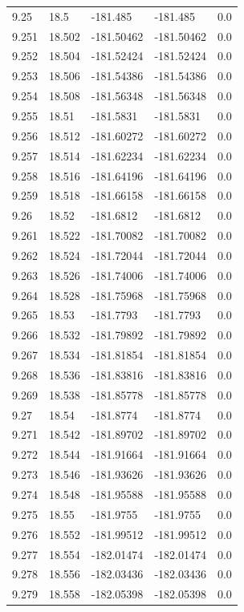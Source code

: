 \begin{tabular}{lllll}
9.25 & 18.5 & -181.485 & -181.485 & 0.0 \\
9.251 & 18.502 & -181.50462 & -181.50462 & 0.0 \\
9.252 & 18.504 & -181.52424 & -181.52424 & 0.0 \\
9.253 & 18.506 & -181.54386 & -181.54386 & 0.0 \\
9.254 & 18.508 & -181.56348 & -181.56348 & 0.0 \\
9.255 & 18.51 & -181.5831 & -181.5831 & 0.0 \\
9.256 & 18.512 & -181.60272 & -181.60272 & 0.0 \\
9.257 & 18.514 & -181.62234 & -181.62234 & 0.0 \\
9.258 & 18.516 & -181.64196 & -181.64196 & 0.0 \\
9.259 & 18.518 & -181.66158 & -181.66158 & 0.0 \\
9.26 & 18.52 & -181.6812 & -181.6812 & 0.0 \\
9.261 & 18.522 & -181.70082 & -181.70082 & 0.0 \\
9.262 & 18.524 & -181.72044 & -181.72044 & 0.0 \\
9.263 & 18.526 & -181.74006 & -181.74006 & 0.0 \\
9.264 & 18.528 & -181.75968 & -181.75968 & 0.0 \\
9.265 & 18.53 & -181.7793 & -181.7793 & 0.0 \\
9.266 & 18.532 & -181.79892 & -181.79892 & 0.0 \\
9.267 & 18.534 & -181.81854 & -181.81854 & 0.0 \\
9.268 & 18.536 & -181.83816 & -181.83816 & 0.0 \\
9.269 & 18.538 & -181.85778 & -181.85778 & 0.0 \\
9.27 & 18.54 & -181.8774 & -181.8774 & 0.0 \\
9.271 & 18.542 & -181.89702 & -181.89702 & 0.0 \\
9.272 & 18.544 & -181.91664 & -181.91664 & 0.0 \\
9.273 & 18.546 & -181.93626 & -181.93626 & 0.0 \\
9.274 & 18.548 & -181.95588 & -181.95588 & 0.0 \\
9.275 & 18.55 & -181.9755 & -181.9755 & 0.0 \\
9.276 & 18.552 & -181.99512 & -181.99512 & 0.0 \\
9.277 & 18.554 & -182.01474 & -182.01474 & 0.0 \\
9.278 & 18.556 & -182.03436 & -182.03436 & 0.0 \\
9.279 & 18.558 & -182.05398 & -182.05398 & 0.0 \\

\end{tabular}
